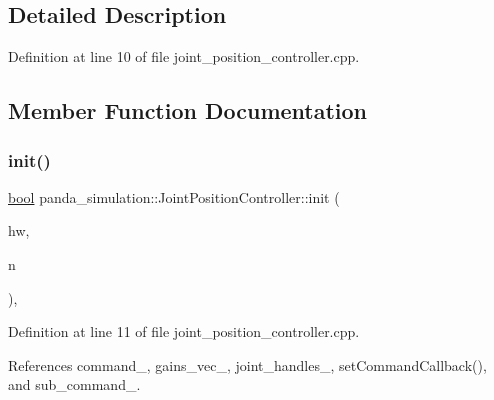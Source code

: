 \subsection{Detailed Description}


Definition at line 10 of file joint\+\_\+position\+\_\+controller.\+cpp.



\subsection{Member Function Documentation}
\mbox{\label{classpanda__simulation_1_1JointPositionController_a51edb4326fc39dafe64995e0361ba42c}} 
\subsubsection{\texorpdfstring{init()}{init()}}
{\footnotesize\ttfamily \hyperlink{classbool}{bool} panda\+\_\+simulation\+::\+Joint\+Position\+Controller\+::init (\begin{DoxyParamCaption}\item[{hardware\+\_\+interface\+::\+Position\+Joint\+Interface $\ast$}]{hw,  }\item[{ros\+::\+Node\+Handle \&}]{n }\end{DoxyParamCaption})\hspace{0.3cm}{\ttfamily [inline]}, {\ttfamily [private]}}



Definition at line 11 of file joint\+\_\+position\+\_\+controller.\+cpp.



References command\+\_\+, gains\+\_\+vec\+\_\+, joint\+\_\+handles\+\_\+, set\+Command\+Callback(), and sub\+\_\+command\+\_\+.


